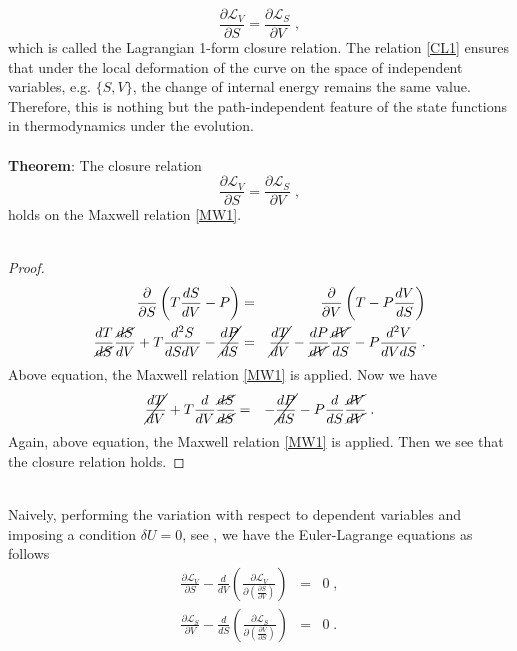 \documentclass[12pt]{article}
\numberwithin{equation}{section}
\theoremstyle{remark}
\theoremstyle{definition}
\newcommand{\nn}{\nonumber}
\begin{document}
\begin{equation}\label{CL1}
    \frac{\partial\mathcal{L}_V}{\partial S}=\frac{\partial\mathcal{L}_S}{\partial V}\;,
\end{equation}
which is called the Lagrangian 1-form closure relation. The relation \eqref{CL1} ensures that under the local deformation of the curve on the space of independent variables, e.g. $\{S,V\}$, the change of internal energy remains the same value. Therefore, this is nothing but the path-independent feature of the state functions in thermodynamics under the evolution.
\\
\\
\textbf{Theorem}: The closure relation 
\begin{equation}
    \frac{\partial\mathcal{L}_V}{\partial S}=\frac{\partial\mathcal{L}_S}{\partial V}\;,\nn
\end{equation}
holds on the Maxwell relation \eqref{MW1}.
\\
\\
\begin{proof} 
\begin{eqnarray}
    \frac{\partial}{\partial S}\left(T\frac{dS}{dV}-P\right)&=&\frac{\partial}{\partial V}\left(T-P\frac{dV}{dS}\right)\nn\\
    \frac{dT}{\cancel{dS}}\frac{\cancel{dS}}{dV}+T\frac{d^2S}{dSdV}-\cancel{\frac{dP}{dS}}&=&\cancel{\frac{dT}{dV}}-\frac{dP}{\cancel{dV}}\frac{\cancel{dV}}{dS}-P\frac{d^2V}{dVdS}\;.
\end{eqnarray}
Above equation, the Maxwell relation \eqref{MW1} is applied. Now we have
\begin{eqnarray}
    \cancel{\frac{dT}{dV}}+T\frac{d}{dV}\frac{\cancel{dS}}{\cancel{dS}}&=&-\cancel{\frac{dP}{dS}}-P\frac{d}{dS}\frac{\cancel{dV}}{\cancel{dV}}\;.
\end{eqnarray}
Again, above equation, the Maxwell relation \eqref{MW1} is applied. Then we see that the closure relation holds.
\end{proof}
\phantom{d}
\\
Naively, performing the variation with respect to dependent variables and imposing a condition $\delta U=0$, see \cite{Yookong1,Yookong2}, we have the Euler-Lagrange equations as follows
\begin{eqnarray}
    \frac{\partial \mathcal{L}_V}{\partial S}-\frac{d}{dV}\left(\frac{\partial \mathcal{L}_V}{\partial\left(\frac{\partial S}{\partial V}\right)}\right)&=&0\;,\\
    \frac{\partial \mathcal{L}_S}{\partial V}-\frac{d}{dS}\left(\frac{\partial \mathcal{L}_S}{\partial\left(\frac{\partial V}{\partial S}\right)}\right)&=&0\;.
\end{eqnarray}
\end{document}
